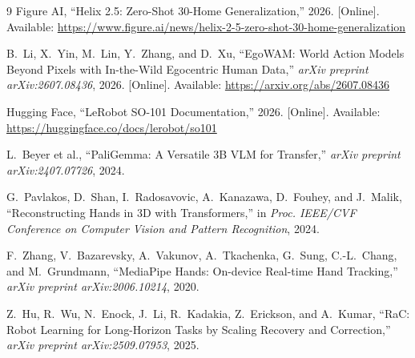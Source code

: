 \documentclass[10pt,conference]{IEEEtran}
\begin{document}
\begin{thebibliography}{9}
Figure AI,
``Helix 2.5: Zero-Shot 30-Home Generalization,'' 2026. [Online]. Available:
\url{https://www.figure.ai/news/helix-2-5-zero-shot-30-home-generalization}

B.~Li, X.~Yin, M.~Lin, Y.~Zhang, and D.~Xu,
``EgoWAM: World Action Models Beyond Pixels with In-the-Wild Egocentric
Human Data,''
\emph{arXiv preprint arXiv:2607.08436}, 2026. [Online]. Available:
\url{https://arxiv.org/abs/2607.08436}

Hugging Face,
``LeRobot SO-101 Documentation,'' 2026. [Online]. Available:
\url{https://huggingface.co/docs/lerobot/so101}


L.~Beyer et al.,
``PaliGemma: A Versatile 3B VLM for Transfer,''
\emph{arXiv preprint arXiv:2407.07726}, 2024.

G.~Pavlakos, D.~Shan, I.~Radosavovic, A.~Kanazawa, D.~Fouhey, and J.~Malik,
``Reconstructing Hands in 3D with Transformers,''
in \emph{Proc. IEEE/CVF Conference on Computer Vision and Pattern Recognition},
2024.


F.~Zhang, V.~Bazarevsky, A.~Vakunov, A.~Tkachenka, G.~Sung,
C.-L.~Chang, and M.~Grundmann,
``MediaPipe Hands: On-device Real-time Hand Tracking,''
\emph{arXiv preprint arXiv:2006.10214}, 2020.

Z.~Hu, R.~Wu, N.~Enock, J.~Li, R.~Kadakia, Z.~Erickson, and A.~Kumar,
``RaC: Robot Learning for Long-Horizon Tasks by Scaling Recovery and
Correction,''
\emph{arXiv preprint arXiv:2509.07953}, 2025.

\end{thebibliography}
\end{document}
